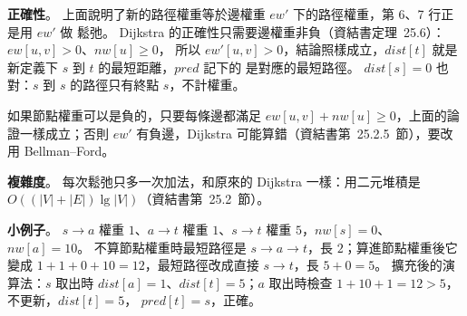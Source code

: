 \begin{pastsoln}
\textbf{正確性}。 上面說明了新的路徑權重等於邊權重 $ew'$ 下的路徑權重，第 6、7 行正是用 $ew'$ 做
鬆弛。 Dijkstra 的正確性只需要邊權重非負（資結書定理~25.6）：$ew[u, v] > 0$、$nw[u] \ge 0$，
所以 $ew'[u, v] > 0$，結論照樣成立，$dist[t]$ 就是新定義下 $s$ 到 $t$ 的最短距離，$pred$ 記下的
是對應的最短路徑。 $dist[s] = 0$ 也對：$s$ 到 $s$ 的路徑只有終點 $s$，不計權重。

如果節點權重可以是負的，只要每條邊都滿足 $ew[u, v] + nw[u] \ge 0$，上面的論證一樣成立；否則
$ew'$ 有負邊，Dijkstra 可能算錯（資結書第~25.2.5~節），要改用 Bellman--Ford。

\textbf{複雜度}。 每次鬆弛只多一次加法，和原來的 Dijkstra 一樣：用二元堆積是
$O((|V| + |E|) \lg |V|)$（資結書第~25.2~節）。

\textbf{小例子}。 $s \to a$ 權重 $1$、$a \to t$ 權重 $1$、$s \to t$ 權重 $5$，$nw[s] = 0$、
$nw[a] = 10$。 不算節點權重時最短路徑是 $s \to a \to t$，長 $2$；算進節點權重後它變成
$1 + 1 + 0 + 10 = 12$，最短路徑改成直接 $s \to t$，長 $5 + 0 = 5$。 擴充後的演算法：$s$ 取出時
$dist[a] = 1$、$dist[t] = 5$；$a$ 取出時檢查 $1 + 10 + 1 = 12 > 5$，不更新，$dist[t] = 5$，
$pred[t] = s$，正確。
\end{pastsoln}
